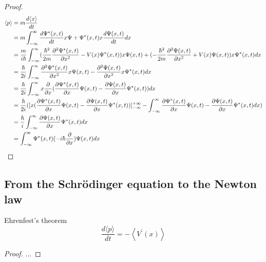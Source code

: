 \begin{proof}
    \begin{align*}
        \langle p \rangle & = m \frac{d \langle x \rangle}{d t}                                                                                                                                                                                                                                   \\
                          & = m \int_{-\infty}^{\infty} \frac{d \Psi^*(x,t)}{dt} x \Psi + \Psi^*(x,t) x \frac{d \Psi(x,t)}{dt} dx                                                                                                                                                                 \\
                          & = \frac{m}{i \hbar} \int_{-\infty}^{\infty} (\frac{\hbar^{2}}{2 m} \frac{\partial^{2} \Psi^{*}(x, t)}{\partial x^{2}}-V(x) \Psi^{*}(x, t)) x \Psi(x,t) +    (-\frac{\hbar^{2}}{2 m} \frac{\partial^{2} \Psi(x, t)}{\partial x^{2}} +V(x) \Psi(x, t)) x \Psi^*(x,t) dx \\
                          & = \frac{\hbar}{2i} \int_{-\infty}^{\infty} \frac{\partial^{2} \Psi^*(x, t)}{\partial x^{2}} x \Psi(x, t) - \frac{\partial^{2} \Psi(x, t)}{\partial x^{2}}  x \Psi^*(x, t) dx                                                                                                        \\
                          & = \frac{\hbar}{2i} \int_{-\infty}^{\infty} x \frac{\partial}{\partial x} (\frac{\partial \Psi^*(x, t)}{\partial x} \Psi(x, t) - \frac{\partial \Psi(x, t)}{\partial x} \Psi^*(x, t)) dx                                                                                             \\
                          & = \frac{\hbar}{2 i} ([x (\frac{\partial \Psi^*(x, t)}{\partial x} \Psi(x, t) - \frac{\partial \Psi(x, t)}{\partial x} \Psi^*(x, t))]_{-\infty}^{+\infty} - \int_{-\infty}^{\infty} \frac{\partial \Psi^*(x, t)}{\partial x} \Psi(x, t) - \frac{\partial \Psi(x, t)}{\partial x} \Psi^*(x, t) dx)
                          \\
                          &= \frac{\hbar}{i} \int_{-\infty}^{\infty} \frac{\partial \Psi (x,t)}{\partial x} \Psi^* (x,t) dx
                          \\
                          &= \int_{-\infty}^{\infty} \Psi^*(x,t) (-i\hbar \frac{\partial}{\partial x}) \Psi(x,t) dx
    \end{align*}
\end{proof}

\subsection{From the Schrödinger equation to the Newton law}
Ehrenfest's theorem
\begin{equation}
    \frac{d\langle p\rangle}{d t}=-\left\langle V^{\prime}(x)\right\rangle
\end{equation}
\begin{proof}
    ...
\end{proof}


